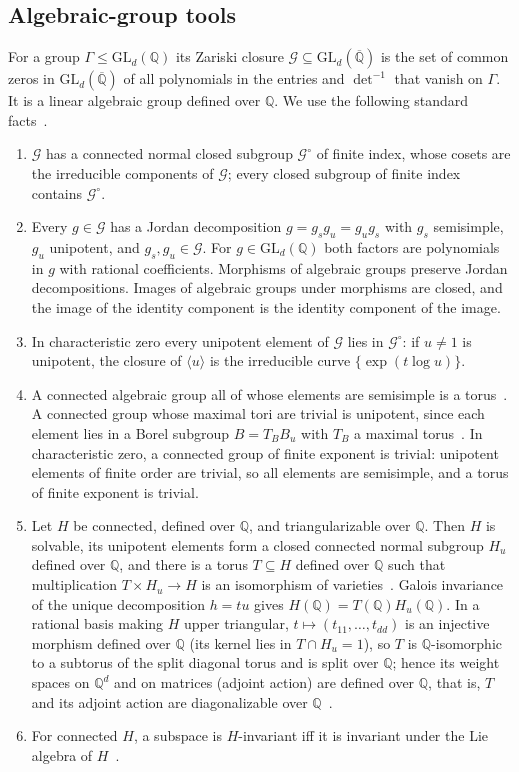 \documentclass[acmlarge,screen,11pt,nonacm,natbib=false]{acmart}
\newcommand{\Q}{\mathbb{Q}}
\newcommand{\Qb}{\overline{\mathbb{Q}}}
\newcommand{\cG}{\mathcal{G}}
\newcommand{\GL}{\mathrm{GL}}
\theoremstyle{definition}
\begin{document}
\subsection{Algebraic-group tools}
For a group $\Gamma\le\GL_d(\Q)$ its Zariski closure $\cG\subseteq\GL_d(\Qb)$ is the set of common zeros in $\GL_d(\Qb)$ of all polynomials in the entries and $\det^{-1}$ that vanish on $\Gamma$. It is a linear algebraic group defined over $\Q$. We use the following standard facts~\cite{Bor91,Hum75}.
\begin{enumerate}
\item[(A1)] $\cG$ has a connected normal closed subgroup $\cG^\circ$ of finite index, whose cosets are the irreducible components of $\cG$; every closed subgroup of finite index contains $\cG^\circ$.
\item[(A2)] Every $g\in\cG$ has a Jordan decomposition $g=g_sg_u=g_ug_s$ with $g_s$ semisimple, $g_u$ unipotent, and $g_s,g_u\in\cG$. For $g\in\GL_d(\Q)$ both factors are polynomials in $g$ with rational coefficients. Morphisms of algebraic groups preserve Jordan decompositions. Images of algebraic groups under morphisms are closed, and the image of the identity component is the identity component of the image.
\item[(A3)] In characteristic zero every unipotent element of $\cG$ lies in $\cG^\circ$: if $u\ne1$ is unipotent, the closure of $\langle u\rangle$ is the irreducible curve $\{\exp(t\log u)\}$.
\item[(A4)] A connected algebraic group all of whose elements are semisimple is a torus~\cite[11.5]{Bor91}. A connected group whose maximal tori are trivial is unipotent, since each element lies in a Borel subgroup $B=T_BB_u$ with $T_B$ a maximal torus~\cite[10.6, 11.10]{Bor91}. In characteristic zero, a connected group of finite exponent is trivial: unipotent elements of finite order are trivial, so all elements are semisimple, and a torus of finite exponent is trivial.
\item[(A5)] Let $H$ be connected, defined over $\Q$, and triangularizable over $\Q$. Then $H$ is solvable, its unipotent elements form a closed connected normal subgroup $H_u$ defined over $\Q$, and there is a torus $T\subseteq H$ defined over $\Q$ such that multiplication $T\times H_u\to H$ is an isomorphism of varieties~\cite[10.6, 18.2]{Bor91}. Galois invariance of the unique decomposition $h=tu$ gives $H(\Q)=T(\Q)H_u(\Q)$. In a rational basis making $H$ upper triangular, $t\mapsto(t_{11},\ldots,t_{dd})$ is an injective morphism defined over $\Q$ (its kernel lies in $T\cap H_u=1$), so $T$ is $\Q$-isomorphic to a subtorus of the split diagonal torus and is split over $\Q$; hence its weight spaces on $\Q^d$ and on matrices (adjoint action) are defined over $\Q$, that is, $T$ and its adjoint action are diagonalizable over $\Q$~\cite[\S8]{Bor91}.
\item[(A6)] For connected $H$, a subspace is $H$-invariant iff it is invariant under the Lie algebra of $H$~\cite[13.2]{Hum75}.
\end{enumerate}
\end{document}
